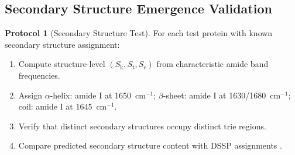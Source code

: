 \documentclass[11pt,twocolumn,a4paper]{article}
\theoremstyle{definition}
\newtheorem{protocol}[theorem]{Protocol}
\theoremstyle{remark}
\newcommand{\Sk}{S_{\mathrm{k}}}
\newcommand{\St}{S_{\mathrm{t}}}
\newcommand{\Se}{S_{\mathrm{e}}}
\begin{document}
\subsection{Secondary Structure Emergence Validation}

\begin{protocol}[Secondary Structure Test]
\label{prot:ss_test}
For each test protein with known secondary structure assignment:
\begin{enumerate}[nosep]
\item Compute structure-level $(\Sk, \St, \Se)$ from characteristic amide band frequencies.
\item Assign $\alpha$-helix: amide I at 1650~cm$^{-1}$; $\beta$-sheet: amide I at 1630/1680~cm$^{-1}$; coil: amide I at 1645~cm$^{-1}$.
\item Verify that distinct secondary structures occupy distinct trie regions.
\item Compare predicted secondary structure content with DSSP assignments \citep{kabsch1983}.
\end{enumerate}
\end{protocol}
\end{document}
